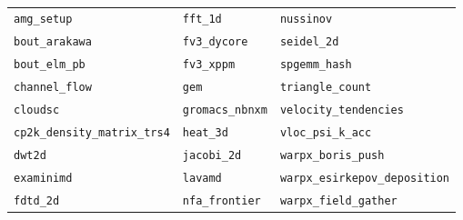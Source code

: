 \begin{table}[!ht]
\begin{center}
\scriptsize
\setlength{\tabcolsep}{3pt}
\begin{tabular}{@{}lll@{}}
\toprule
\texttt{amg\_setup} & \texttt{fft\_1d} & \texttt{nussinov} \\
\texttt{bout\_arakawa} & \texttt{fv3\_dycore} & \texttt{seidel\_2d} \\
\texttt{bout\_elm\_pb} & \texttt{fv3\_xppm} & \texttt{spgemm\_hash} \\
\texttt{channel\_flow} & \texttt{gem} & \texttt{triangle\_count} \\
\texttt{cloudsc} & \texttt{gromacs\_nbnxm} & \texttt{velocity\_tendencies} \\
\texttt{cp2k\_density\_matrix\_trs4} & \texttt{heat\_3d} & \texttt{vloc\_psi\_k\_acc} \\
\texttt{dwt2d} & \texttt{jacobi\_2d} & \texttt{warpx\_boris\_push} \\
\texttt{examinimd} & \texttt{lavamd} & \texttt{warpx\_esirkepov\_deposition} \\
\texttt{fdtd\_2d} & \texttt{nfa\_frontier} & \texttt{warpx\_field\_gather} \\
\bottomrule
\end{tabular}
\end{center}
\caption{}
\label{tab:exp-git-vs-kernel}
\end{table}
